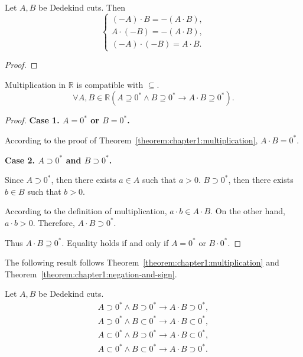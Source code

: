 \begin{theorem}
    Let $A, B$ be Dedekind cuts. Then
    \[
        \begin{cases}
            (-A)\cdot B = -(A\cdot B), \\
            A\cdot (-B) = -(A\cdot B), \\
            (-A)\cdot (-B) = A\cdot B.
        \end{cases}
    \]
\end{theorem}

\begin{proof}
\end{proof}

\begin{theorem}
    Multiplication in $\mathbb{R}$ is compatible with $\subseteq$.
    \[
        \forall A, B\in\mathbb{R}(A\supseteq {0}^{*}\land B\supseteq {0}^{*}\rightarrow A\cdot B\supseteq {0}^{*}).
    \]
\end{theorem}

\begin{proof}
    \textbf{Case 1. $A = {0}^{*}$ or $B = {0}^{*}$.}

    According to the proof of Theorem~\ref{theorem:chapter1:multiplication}, $A\cdot B = {0}^{*}$.

    \textbf{Case 2. $A\supset {0}^{*}$ and $B\supset {0}^{*}$.}

    Since $A\supset {0}^{*}$, then there exists $a\in A$ such that $a > 0$. $B\supset {0}^{*}$, then there exists $b\in B$ such that $b > 0$.

    According to the definition of multiplication, $a\cdot b\in A\cdot B$. On the other hand, $a\cdot b > 0$. Therefore, $A\cdot B\supset {0}^{*}$.

    Thus $A\cdot B\supseteq {0}^{*}$. Equality holds if and only if $A = {0}^{*}$ or $B\cdot {0}^{*}$.
\end{proof}

The following result follows Theorem~\ref{theorem:chapter1:multiplication} and Theorem~\ref{theorem:chapter1:negation-and-sign}.

\begin{corollary}
    Let $A, B$ be Dedekind cuts.
    \[
        \begin{split}
            A\supset {0}^{*}\land B\supset {0}^{*}\rightarrow A\cdot B\supset {0}^{*}, \\
            A\supset {0}^{*}\land B\subset {0}^{*}\rightarrow A\cdot B\subset {0}^{*}, \\
            A\subset {0}^{*}\land B\supset {0}^{*}\rightarrow A\cdot B\subset {0}^{*}, \\
            A\subset {0}^{*}\land B\subset {0}^{*}\rightarrow A\cdot B\supset {0}^{*}.
        \end{split}
    \]
\end{corollary}

